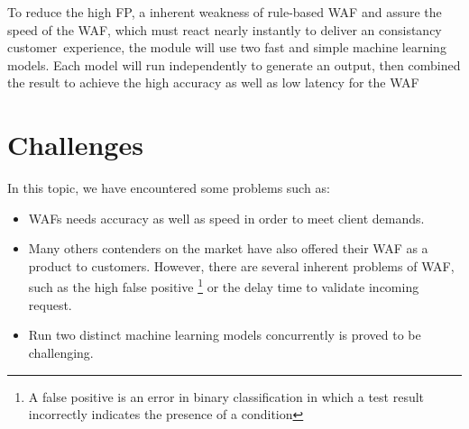 To reduce the high FP, a inherent weakness of rule-based WAF and assure the speed of the WAF, which must react nearly instantly to deliver an consistancy customer experience, the module will use two fast and simple machine learning models. Each model will run independently to generate an output, then combined the result to achieve the high accuracy as well as low latency for the WAF

\section{Challenges}
\label{sec:challenges}
In this topic, we have encountered some problems such as:
\begin{itemize}
    \item WAFs needs accuracy as well as speed in order to meet client demands.
    \item Many others contenders on the market have also offered their WAF as a product to customers. However, there are several inherent problems of WAF, such as the high false positive \footnote{A false positive is an error in binary classification in which a test result incorrectly indicates the presence of a condition} or the delay time to validate incoming request.
    \item Run two distinct machine learning models concurrently is proved to be challenging.
\end{itemize}
